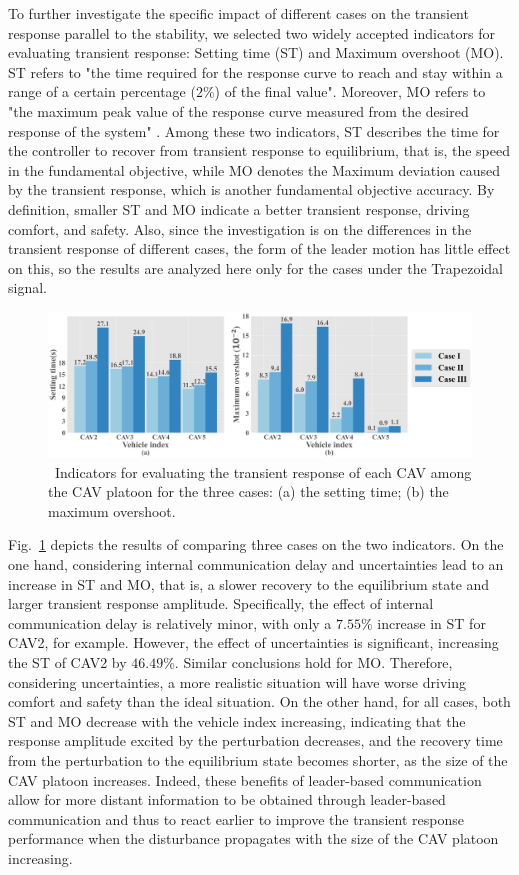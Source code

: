 \documentclass[a4paper]{cas-sc}
\begin{document}
To further investigate the specific impact of different cases on the transient response parallel to the stability, we selected two widely accepted indicators for evaluating transient response: Setting time (ST) and Maximum overshoot (MO). ST refers to "the time required for the response curve to reach and stay within a range of a certain percentage ($2\%$) of the final value". Moreover, MO refers to "the maximum peak value of the response curve measured from the desired response of the system" \citep{ogata1995discrete}. Among these two indicators, ST describes the time for the controller to recover from transient response to equilibrium, that is, the speed in the fundamental objective, while MO denotes the Maximum deviation caused by the transient response, which is another fundamental objective accuracy. By definition, smaller ST and MO indicate a better transient response, driving comfort, and safety. Also, since the investigation is on the differences in the transient response of different cases, the form of the leader motion has little effect on this, so the results are analyzed here only for the cases under the Trapezoidal signal.


\begin{figure}
  \centering
  \includegraphics[width=14cm]{figs/fig5.png}
  \caption{~Indicators for evaluating the transient response of each CAV among the CAV platoon for the three cases: (a) the setting time; (b) the maximum overshoot.}
  \label{fig5}
\end{figure}

Fig.~\ref{fig5} depicts the results of comparing three cases on the two indicators. On the one hand, considering internal communication delay and uncertainties lead to an increase in ST and MO, that is, a slower recovery to the equilibrium state and larger transient response amplitude. Specifically, the effect of internal communication delay is relatively minor, with only a $7.55\%$ increase in ST for CAV2, for example. However, the effect of uncertainties is significant, increasing the ST of CAV2 by $46.49\%$. Similar conclusions hold for MO. Therefore, considering uncertainties, a more realistic situation will have worse driving comfort and safety than the ideal situation. On the other hand, for all cases, both ST and MO decrease with the vehicle index increasing, indicating that the response amplitude excited by the perturbation decreases, and the recovery time from the perturbation to the equilibrium state becomes shorter, as the size of the CAV platoon increases. Indeed, these benefits of leader-based communication allow for more distant information to be obtained through leader-based communication and thus to react earlier to improve the transient response performance when the disturbance propagates with the size of the CAV platoon increasing.
\end{document}
